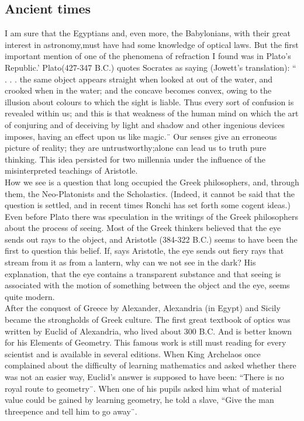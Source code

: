          \subsection{Ancient times}

            I am sure that the Egyptians and, even more, the Babylonians, with their great interest in astronomy,must have had some knowledge of optical laws. But the first important mention of one of the phenomena of refraction I found was in Plato's Republic.' Plato(427-347 B.C.) quotes Socrates as saying (Jowett's translation): `` . . . the same object appears straight when looked at out of the water, and crooked when in the water; and the concave becomes convex, owing to the illusion about colours to which the sight is liable. Thus every sort of confusion is revealed within us; and this is that weakness of the human mind on which the art of conjuring and of deceiving by light and shadow and other ingenious devices imposes, having an effect upon us like magic.¨ Our senses give an erroneous picture of reality; they are untrustworthy;alone can lead us to truth pure thinking. This idea persisted for two millennia under the influence of the misinterpreted teachings of Aristotle.\\

            How we see is a question that long occupied the Greek philosophers, and, through them, the Neo-Platonists and the Scholastics. (Indeed, it cannot be said that the question is settled, and in recent times Ronchi  has set forth some cogent ideas.) Even before Plato there was speculation in the writings of the Greek philosophers about the process of seeing. Most of the Greek thinkers believed that the eye sends out rays to the object, and Aristotle (384-322 B.C.) seems to have been the first to question this belief. If, says Aristotle, the eye sends out fiery rays that stream from it as from a lantern, why can we not see in the dark? His explanation, that the eye contains a transparent substance and that seeing is associated with the motion of something between the object and the eye, seems quite modern.\\

            After the conquest of Greece by Alexander, Alexandria (in Egypt) and Sicily became the strongholds of Greek culture. The first great textbook of optics was written by Euclid of Alexandria, who lived about 300 B.C. And is better known for his Elements of Geometry. This famous work is still must reading for every scientist and is available in several editions. When King Archelaos once complained about the difficulty of learning mathematics and asked whether there was not an easier way, Euclid's answer is supposed to have been: ``There is no royal route to geometry¨. When one of his pupils asked him what of material value could be gained by learning geometry, he told a slave, ``Give the man threepence and tell him to go away¨.\\

